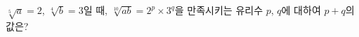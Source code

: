 $\sqrt[5]{a}=2$, $\sqrt[4]{b}=3$일 때, $\sqrt[10]{ab}=2^p\times3^q$을 만족시키는 유리수 $p$, $q$에 대하여 $p+q$의 값은? 
